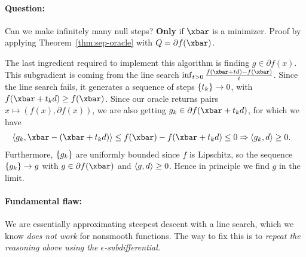 \paragraph{Question:} Can we make infinitely many null steps?
\textbf{Only} if $\xbar$ is a minimizer. Proof by
applying Theorem~\ref{thm:sep-oracle} with $Q = \partial f(\xbar)$.

The last ingredient required to implement this algorithm is finding $g \in
\partial f(x)$. This subgradient is coming from the line search $\inf_{t > 0}
\frac{f(\xbar + td) - f(\xbar)}{t}$. Since the line search fails, it generates
a sequence of steps $\left\{ t_k \right\} \to 0$, with $f(\xbar + t_k d) \geq f(\xbar)$.
Since our oracle returns pairs $x \mapsto (f(x), \partial f(x))$, we are also
getting $g_k \in \partial f(\xbar + t_k d)$, for which we have
\begin{align*}
	\ip{g_k, \xbar - (\xbar + t_k d)} &\leq f(\xbar) - f(\xbar + t_k d)
	\leq 0 \Rightarrow \ip{g_k, d} \geq 0.
\end{align*}
Furthermore, $\left\{ g_k \right\}$ are uniformly bounded since $f$ is Lipschitz, so the
sequence $\left\{ g_k \right\} \to g$ with $g \in \partial f(\xbar)$ and $\left\langle g, d \right\rangle \geq
0$.
Hence in principle we find $g$ in the limit.

\paragraph{Fundamental flaw:} We are essentially approximating steepest descent
with a line search, which we know \textit{does not work} for nonsmooth functions.
The way to fix this is to \textit{repeat the reasoning above using the
$\epsilon$-subdifferential.}
